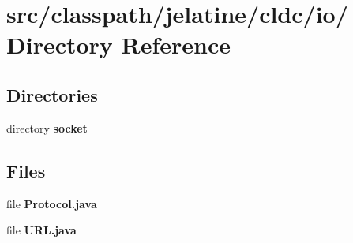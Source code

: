 \section{src/classpath/jelatine/cldc/io/ Directory Reference}
\label{dir_a7043a91d6bb697c93ce9611480ba6ec}
\subsection*{Directories}
\begin{DoxyCompactItemize}
\item 
directory {\bf socket}
\end{DoxyCompactItemize}
\subsection*{Files}
\begin{DoxyCompactItemize}
\item 
file {\bfseries Protocol.java}
\item 
file {\bfseries URL.java}
\end{DoxyCompactItemize}

